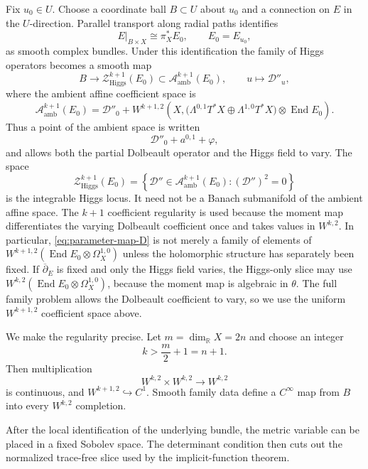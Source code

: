 \documentclass[11pt,reqno]{amsart}
\theoremstyle{definition}
\theoremstyle{remark}
\newcommand{\R}{\mathbb R}
\newcommand{\cA}{\mathcal A}
\newcommand{\cD}{\mathcal D}
\newcommand{\cZ}{\mathcal Z}
\newcommand{\End}{\operatorname{End}}
\newcommand{\ddbar}{\overline\partial}
\newcommand{\set}[1]{\left\{#1\right\}}
\begin{document}
Fix $u_0\in U$.  Choose a coordinate ball $B\subset U$ about $u_0$ and a connection on $E$ in the $U$-direction.  Parallel transport along radial paths identifies
\[
  E|_{B\times X}\cong \pi_X^*E_0,
  \qquad E_0=E_{u_0},
\]
as smooth complex bundles.  Under this identification the family of Higgs operators becomes a smooth map
\begin{equation}\label{eq:parameter-map-D}
  B\longrightarrow \cZ^{k+1}_{\mathrm{Higgs}}(E_0)
  \subset \cA^{k+1}_{\mathrm{amb}}(E_0),
  \qquad
  u\longmapsto\cD''_u,
\end{equation}
where the ambient affine coefficient space is
\begin{equation}\label{eq:ambient-Higgs-affine-space}
  \cA^{k+1}_{\mathrm{amb}}(E_0)
  =\cD''_0+
  W^{k+1,2}\!\left(
    X,
    \bigl(\Lambda^{0,1}T^*X\oplus\Lambda^{1,0}T^*X\bigr)
    \otimes\End E_0
  \right).
\end{equation}
Thus a point of the ambient space is written
\[
  \cD''_0+a^{0,1}+\varphi,
\]
and allows both the partial Dolbeault operator and the Higgs field to vary.  The space
\begin{equation}\label{eq:integrable-Higgs-locus}
  \cZ^{k+1}_{\mathrm{Higgs}}(E_0)
  =\set{\cD''\in\cA^{k+1}_{\mathrm{amb}}(E_0):(\cD'')^2=0}
\end{equation}
is the integrable Higgs locus.  It need not be a Banach submanifold of
the ambient affine space.  The $k+1$ coefficient regularity is used
because the moment map differentiates the varying Dolbeault coefficient
once and takes values in $W^{k,2}$.  In particular,
\eqref{eq:parameter-map-D} is not merely a family of elements of
$W^{k+1,2}(\End E_0\otimes\Omega_X^{1,0})$ unless the holomorphic
structure has separately been fixed.
If $\ddbar_E$ is fixed and only the Higgs field varies, the Higgs-only
slice may use $W^{k,2}(\End E_0\otimes\Omega_X^{1,0})$, because the
moment map is algebraic in $\theta$.  The full family problem allows the
Dolbeault coefficient to vary, so we use the uniform $W^{k+1,2}$
coefficient space above.

We make the regularity precise.  Let $m=\dim_\R X=2n$ and choose an integer
\begin{equation}\label{eq:k-assumption}
  k>\frac m2+1=n+1.
\end{equation}
Then multiplication
\[
  W^{k,2}\times W^{k,2}\to W^{k,2}
\]
is continuous, and $W^{k+1,2}\hookrightarrow C^1$.  Smooth family data define a $C^\infty$ map from $B$ into every $W^{k,2}$ completion.


After the local identification of the underlying bundle, the metric variable can be placed in a fixed Sobolev space.  The determinant condition then cuts out the normalized trace-free slice used by the implicit-function theorem.
\end{document}
